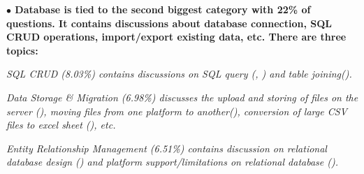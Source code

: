 

\nd\bf{$\bullet$ Database} is tied to the second biggest category with 22\% of questions. It contains discussions about database connection, SQL CRUD
operations, import/export existing data, etc. There are three topics:
\begin{inparaenum}[(1)] \item \it{SQL CRUD (8.03\%)} contains discussions on SQL
query (, ) and table joining().
\item \it{Data Storage \& Migration (6.98\%)} discusses the upload
and storing of files on the server (), moving files from one platform
to another(), conversion of large CSV files to excel sheet
(), etc.
\item \it{Entity Relationship Management (6.51\%)} contains discussion on
relational database design  () and platform support/limitations
on relational database ().
\end{inparaenum} 

